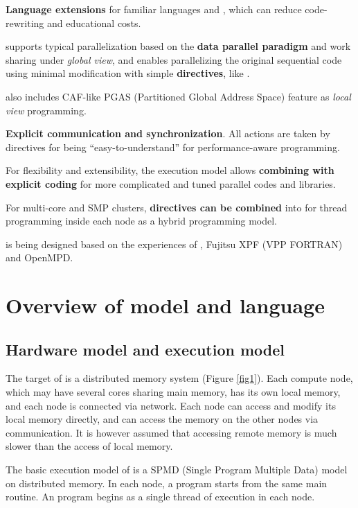 \begin{description}
\item {\bf Language extensions} for familiar languages \C and \Fort,
  which can reduce code-rewriting and educational costs.
\item \XMP supports typical parallelization based on the {\bf data parallel
  paradigm} and work sharing under {\it global view}, and enables
  parallelizing the original sequential code using minimal
  modification with simple {\bf directives}, like \OMP. 
\item \XMP also includes CAF-like PGAS (Partitioned
Global Address Space) feature as {\it local view} programming. 
\item {\bf Explicit communication and synchronization}. All actions
  are taken by directives for being ``easy-to-understand'' for
  performance-aware programming.
\item For flexibility and extensibility, the execution model
allows {\bf combining with explicit \MPI coding} for more complicated
and tuned parallel codes and libraries. 
\item For multi-core and SMP clusters,
{\bf \OMP directives can be combined} into \XMP for thread
programming inside each node as a hybrid programming
model.
\end{description}

\XMP is being designed based on the experiences of \HPF, Fujitsu XPF
(VPP FORTRAN) and OpenMPD.  

\chapter{Overview of \XMP model and language}

\section{Hardware model and execution model}

The target of \XMP is a distributed memory system
(Figure \ref{fig1}). Each compute node, which may have
several cores sharing main 
memory, has its own local memory, and each node is connected via
network. Each node can access and modify its local memory directly,
and can access the memory on the other nodes via communication. It
is however assumed that accessing remote memory is much slower than
the access of local memory.

The basic execution model of
\XMP is a SPMD (Single Program Multiple Data) model on
distributed memory. In each node, a program starts from the same main
routine. An \XMP program begins as a single thread of execution
in each node. 

